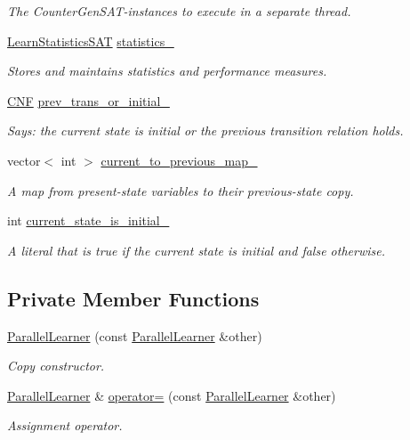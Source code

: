 \begin{DoxyCompactItemize}
\begin{DoxyCompactList}\small\item\em The Counter\-Gen\-S\-A\-T-\/instances to execute in a separate thread. \end{DoxyCompactList}\item 
\hyperlink{classLearnStatisticsSAT}{Learn\-Statistics\-S\-A\-T} \hyperlink{classParallelLearner_abfb2e28ec1a0f8775d3f14f75415a8bd}{statistics\-\_\-}
\begin{DoxyCompactList}\small\item\em Stores and maintains statistics and performance measures. \end{DoxyCompactList}\item 
\hyperlink{classCNF}{C\-N\-F} \hyperlink{classParallelLearner_ac73d9338262855f61f23a65d1df0647c}{prev\-\_\-trans\-\_\-or\-\_\-initial\-\_\-}
\begin{DoxyCompactList}\small\item\em Says\-: the current state is initial or the previous transition relation holds. \end{DoxyCompactList}\item 
vector$<$ int $>$ \hyperlink{classParallelLearner_a6f8dfda6aa8640345057023ed85882b9}{current\-\_\-to\-\_\-previous\-\_\-map\-\_\-}
\begin{DoxyCompactList}\small\item\em A map from present-\/state variables to their previous-\/state copy. \end{DoxyCompactList}\item 
int \hyperlink{classParallelLearner_ae9293a4afd3c52690bcac2ad03884121}{current\-\_\-state\-\_\-is\-\_\-initial\-\_\-}
\begin{DoxyCompactList}\small\item\em A literal that is true if the current state is initial and false otherwise. \end{DoxyCompactList}\end{DoxyCompactItemize}
\subsection*{Private Member Functions}
\begin{DoxyCompactItemize}
\item 
\hyperlink{classParallelLearner_a7857993d63e497f5c946030c3127a578}{Parallel\-Learner} (const \hyperlink{classParallelLearner}{Parallel\-Learner} \&other)
\begin{DoxyCompactList}\small\item\em Copy constructor. \end{DoxyCompactList}\item 
\hyperlink{classParallelLearner}{Parallel\-Learner} \& \hyperlink{classParallelLearner_a870e6d78e50b8aed63555e797ff6cce4}{operator=} (const \hyperlink{classParallelLearner}{Parallel\-Learner} \&other)
\begin{DoxyCompactList}\small\item\em Assignment operator. \end{DoxyCompactList}\end{DoxyCompactItemize}


